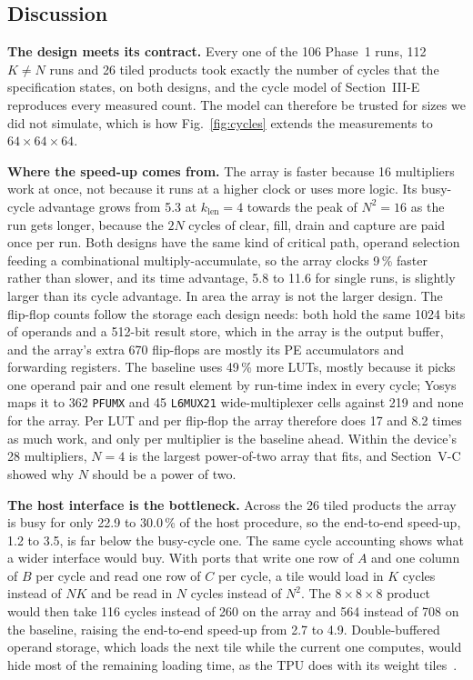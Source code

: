 
\subsection{Discussion}
\textbf{The design meets its contract.} Every one of the 106 Phase~1 runs, 112 $K \neq N$ runs and 26 tiled products took exactly the number of cycles that the specification states, on both designs, and the cycle model of Section~III-E reproduces every measured count. The model can therefore be trusted for sizes we did not simulate, which is how Fig.~\ref{fig:cycles} extends the measurements to $64 \times 64 \times 64$.

\textbf{Where the speed-up comes from.} The array is faster because 16 multipliers work at once, not because it runs at a higher clock or uses more logic. Its busy-cycle advantage grows from 5.3 at $k_{\mathrm{len}} = 4$ towards the peak of $N^2 = 16$ as the run gets longer, because the $2N$ cycles of clear, fill, drain and capture are paid once per run. Both designs have the same kind of critical path, operand selection feeding a combinational multiply-accumulate, so the array clocks 9\,\% faster rather than slower, and its time advantage, 5.8 to 11.6 for single runs, is slightly larger than its cycle advantage. In area the array is not the larger design. The flip-flop counts follow the storage each design needs: both hold the same 1024 bits of operands and a 512-bit result store, which in the array is the output buffer, and the array's extra 670 flip-flops are mostly its PE accumulators and forwarding registers. The baseline uses 49\,\% more LUTs, mostly because it picks one operand pair and one result element by run-time index in every cycle; Yosys maps it to 362 \texttt{PFUMX} and 45 \texttt{L6MUX21} wide-multiplexer cells against 219 and none for the array. Per LUT and per flip-flop the array therefore does 17 and 8.2 times as much work, and only per multiplier is the baseline ahead. Within the device's 28 multipliers, $N = 4$ is the largest power-of-two array that fits, and Section~V-C showed why $N$ should be a power of two.

\textbf{The host interface is the bottleneck.} Across the 26 tiled products the array is busy for only 22.9 to 30.0\,\% of the host procedure, so the end-to-end speed-up, 1.2 to 3.5, is far below the busy-cycle one. The same cycle accounting shows what a wider interface would buy. With ports that write one row of $A$ and one column of $B$ per cycle and read one row of $C$ per cycle, a tile would load in $K$ cycles instead of $NK$ and be read in $N$ cycles instead of $N^2$. The $8 \times 8 \times 8$ product would then take 116 cycles instead of 260 on the array and 564 instead of 708 on the baseline, raising the end-to-end speed-up from 2.7 to 4.9. Double-buffered operand storage, which loads the next tile while the current one computes, would hide most of the remaining loading time, as the TPU does with its weight tiles~\cite{jouppi2017tpu}.

